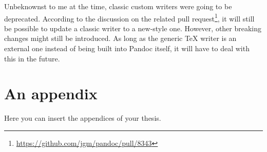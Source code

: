 \documentclass[
  digital,     %
  oneside,     %
  nosansbold,  %
  nocolorbold, %
  lof,         %
  nolot,       %
]{fithesis4}
\begin{document}
Unbeknownst to me at the time, classic custom writers were going to be deprecated. According to the discussion on the related pull request\footnote{\url{https://github.com/jgm/pandoc/pull/8343}}, it will still be possible to update a classic writer to a new-style one. However, other breaking changes might still be introduced. As long as the generic \TeX{} writer is an external one instead of being built into Pandoc itself, it will have to deal with this in the future.

\printbibliography[heading=bibintoc] %

\makeatletter\thesis@blocks@clear\makeatother
{} %
\printindex

\appendix %
\chapter{An appendix}
Here you can insert the appendices of your thesis.
\end{document}
